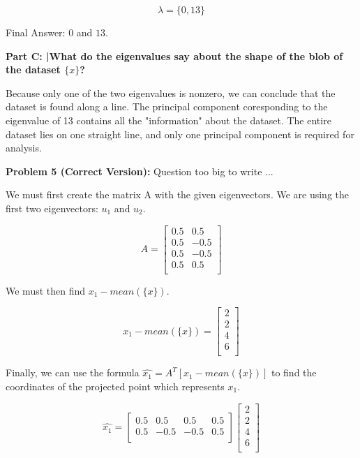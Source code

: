 \documentclass{article}
\begin{document}
 \[\lambda=\{0,13\}\]
 
 Final Answer: $0$ and $13$.\newline
 
 \newline
 
 \textbf{Part C: |What do the eigenvalues say about the shape of the blob of the dataset $\{x\}$?}\newline
 
 Because only one of the two eigenvalues is nonzero, we can conclude that the dataset is found along a line. The principal component coresponding to the eigenvalue of 13 contains all the "information" about the dataset. The entire dataset lies on one straight line, and only one principal component is required for analysis.
 
 \newpage
 
 \begin{center}
     \Large\textbf{Problem 5 (Correct Version):} Question too big to write ... \par
 \end{center}
 
 We must first create the matrix A with the given eigenvectors. We are using the first two eigenvectors: $u_1$ and $u_2$.
 
 \[A = 
 \begin{bmatrix}
     0.5 & 0.5 \\
     0.5 & -0.5 \\
     0.5 & -0.5 \\
     0.5 & 0.5 \\
 \end{bmatrix}
 \]
 
 We must then find $x_1 - mean(\{x\})$.
 
 \[x_1 - mean(\{x\})=
 \begin{bmatrix}
     2 \\
     2 \\
     4 \\
     6 \\
 \end{bmatrix}
 \]
 
 Finally, we can use the formula $\hat{x_1} = A^T[x_1 - mean(\{x\})]$ to find the coordinates of the projected point which represents $x_1$.
 
 \[\hat{x_1}=
 \begin{bmatrix}
     0.5 & 0.5 & 0.5 & 0.5 \\
     0.5 & -0.5 & -0.5 & 0.5 \\
 \end{bmatrix}
  \begin{bmatrix}
     2 \\
     2 \\
     4 \\
     6 \\
 \end{bmatrix}
 \]
 
\end{document}
